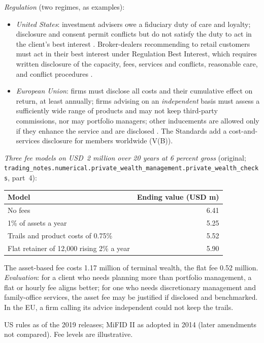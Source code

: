 \begin{qfdefinition}
\emph{Regulation} (two regimes, as examples):
\begin{itemize}
\item \emph{United States}: investment advisers owe a fiduciary duty of care and loyalty; disclosure and consent permit conflicts but do not satisfy the duty to act in the client's best interest \citep[84 FR 33672, 33676]{sec-adviser-standard-of-conduct-2019}. Broker-dealers recommending to retail customers must act in their best interest under Regulation Best Interest, which requires written disclosure of the capacity, fees, services and conflicts, reasonable care, and conflict procedures \citep[para.~(a)]{sec-reg-bi-rule}.
\item \emph{European Union}: firms must disclose all costs and their cumulative effect on return, at least annually; firms advising on an \emph{independent} basis must assess a sufficiently wide range of products and may not keep third-party commissions, nor may portfolio managers; other inducements are allowed only if they enhance the service and are disclosed \citep[Art.~24(4), (7)--(9)]{eu-2014-65-mifid2}. The Standards add a cost-and-services disclosure for members worldwide (V(B)).
\end{itemize}

 \emph{Three fee models on USD~2 million over 20 years at 6 percent gross} (original; \nolinkurl{trading_notes.numerical.private_wealth_management.private_wealth_checks}, part~4):
\begin{center}\small
\begin{tabular}{@{}lr@{}}
\toprule
Model & Ending value (USD m) \\
\midrule
No fees & 6.41 \\
1\% of assets a year & 5.25 \\
Trails and product costs of 0.75\% & 5.52 \\
Flat retainer of 12,000 rising 2\% a year & 5.90 \\
\bottomrule
\end{tabular}
\end{center}
The asset-based fee costs 1.17 million of terminal wealth, the flat fee 0.52 million. \emph{Evaluation}: for a client who needs planning more than portfolio management, a flat or hourly fee aligns better; for one who needs discretionary management and family-office services, the asset fee may be justified if disclosed and benchmarked. In the EU, a firm calling its advice independent could not keep the trails.

 US rules as of the 2019 releases; MiFID II as adopted in 2014 (later amendments not compared). Fee levels are illustrative.


\end{qfdefinition}
